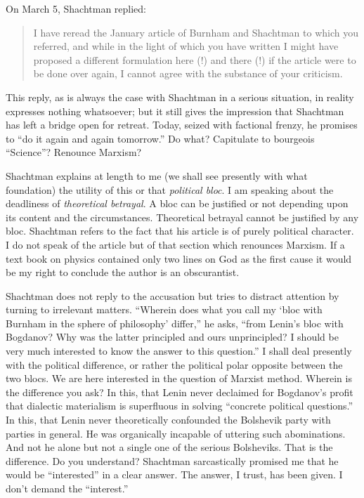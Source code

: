On March 5, Shachtman replied:
\begin{quote}
  I have reread the January article of Burnham and Shachtman to which you referred, and while in the light of which you have written I might have proposed a different formulation here (!) and there (!) if the article were to be done over again, I cannot agree with the substance of your criticism.
\end{quote}
This reply, as is always the case with Shachtman in a serious situation, in reality expresses nothing whatsoever; but it still gives the impression that Shachtman has left a bridge open for retreat. Today, seized with factional frenzy, he promises to “do it again and again tomorrow.” Do what? Capitulate to bourgeois “Science”? Renounce Marxism?

Shachtman explains at length to me (we shall see presently with what foundation) the utility of this or that \emph{political bloc}. I am speaking about the deadliness of \emph{theoretical betrayal}. A bloc can be justified or not depending upon its content and the circumstances. Theoretical betrayal cannot be justified by any bloc. Shachtman refers to the fact that his article is of purely political character. I do not speak of the article but of that section which renounces Marxism. If a text book on physics contained only two lines on God as the first cause it would be my right to conclude the author is an obscurantist.

Shachtman does not reply to the accusation but tries to distract attention by turning to irrelevant matters. “Wherein does what you call my ‘bloc with Burnham in the sphere of philosophy’ differ,” he asks, “from Lenin’s bloc with Bogdanov? Why was the latter principled and ours unprincipled? I should be very much interested to know the answer to this question.” I shall deal presently with the political difference, or rather the political polar opposite between the two blocs. We are here interested in the question of Marxist method. Wherein is the difference you ask? In this, that Lenin never declaimed for Bogdanov’s profit that dialectic materialism is superfluous in solving “concrete political questions.” In this, that Lenin never theoretically confounded the Bolshevik party with parties in general. He was organically incapable of uttering such abominations. And not he alone but not a single one of the serious Bolsheviks. That is the difference. Do you understand? Shachtman sarcastically promised me that he would be “interested” in a clear answer. The answer, I trust, has been given. I don’t demand the “interest.”
\newpage

